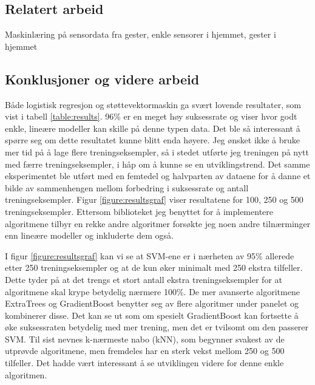 \subsection*{Relatert arbeid}
{\color{red} Maskinlæring på sensordata fra gester, enkle sensorer i hjemmet, gester i hjemmet}

\subsection*{Konklusjoner og videre arbeid}
Både logistisk regresjon og støttevektormaskin ga svært lovende resultater, som vist i tabell \ref{table:results}. 96\% er en meget høy suksessrate og viser hvor godt enkle, lineære modeller kan skille på denne typen data. Det ble så interessant å spørre seg om dette resultatet kunne blitt enda høyere. Jeg ønsket ikke å bruke mer tid på å lage flere treningseksempler, så i stedet utførte jeg treningen på nytt med færre treningseksempler, i håp om å kunne se en utviklingstrend. Det samme eksperimentet ble utført med en femtedel og halvparten av dataene for å danne et bilde av sammenhengen mellom forbedring i suksessrate og antall treningseksempler. Figur \ref{figure:resultsgraf} viser resultatene for 100, 250 og 500 treningseksempler. Ettersom biblioteket jeg benyttet for å implementere algoritmene tilbyr en rekke andre algoritmer forsøkte jeg noen andre tilnærminger enn lineære modeller og inkluderte dem også.

I figur \ref{figure:resultsgraf} kan vi se at SVM-ene er i nærheten av 95\% allerede etter 250 treningseksempler og at de kun øker minimalt med 250 ekstra tilfeller. Dette tyder på at det trengs et stort antall ekstra treningseksempler for at algoritmene skal krype betydelig nærmere 100\%. De mer avanserte algoritmene ExtraTrees og GradientBoost benytter seg av flere algoritmer under panelet og kombinerer disse. Det kan se ut som om spesielt GradientBoost kan fortsette å øke suksessraten betydelig med mer trening, men det er tvilsomt om den passerer SVM. Til sist nevnes k-nærmeste nabo (kNN), som begynner svakest av de utprøvde algoritmene, men fremdeles har en sterk vekst mellom 250 og 500 tilfeller. Det hadde vært interessant å se utviklingen videre for denne enkle algoritmen.

